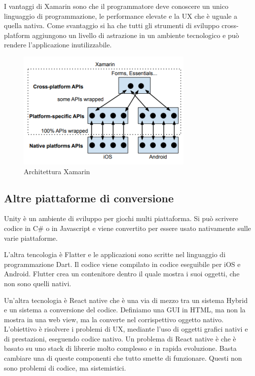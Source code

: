 I vantaggi di Xamarin sono che il programmatore deve conoscere un unico linguaggio di programmazione, le performance elevate e la UX che è uguale a quella nativa. 
Come svantaggio si ha che tutti gli strumenti di sviluppo cross-platform aggiungono un livello di astrazione in un ambiente tecnologico e può rendere l'applicazione inutilizzabile.

\begin{figure}
    \centering
    \includegraphics[width=.5\textwidth]{images/Mobile computing/7. Sviluppo/architettura Xamarin.PNG}
    \caption{Architettura Xamarin}
    \label{fig:architettura Xamarin}
\end{figure}

\subsection{Altre piattaforme di conversione}
Unity è un ambiente di sviluppo per giochi multi piattaforma. 
Si può scrivere codice in C\# o in Javascript e viene convertito per essere usato nativamente sulle varie piattaforme. 

L'altra tencologia è Flatter e le applicazioni sono scritte nel linguaggio di programmazione Dart. Il codice viene compilato in codice eseguibile per iOS e Android.
Flutter crea un contenitore dentro il quale mostra i suoi oggetti, che non sono quelli nativi. 

Un'altra tecnologia è React native che è una via di mezzo tra un sistema Hybrid e un sistema a conversione del codice.
Definiamo una GUI in HTML, ma non la mostra in una web view, ma la converte nel corrispettivo oggetto nativo. 
L’obiettivo è risolvere i problemi di UX, mediante l'uso di oggetti grafici nativi e di prestazioni, eseguendo codice nativo. 
Un problema di React native è che è basato su uno stack di librerie molto complesso e in rapida evoluzione. Basta cambiare una di queste componenti che tutto smette di funzionare. Questi non sono problemi di codice, ma sistemistici.

